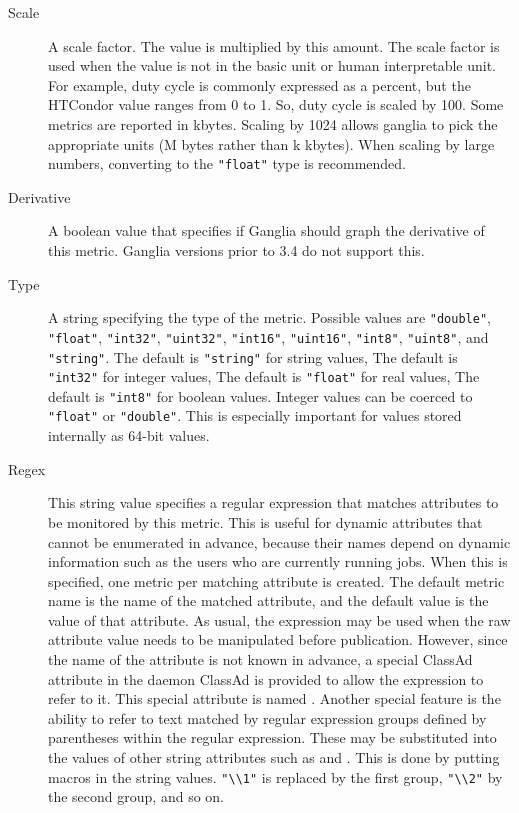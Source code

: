 \begin{description}
  \item[Scale] A scale factor. The value is multiplied by this amount.
    The scale factor is used when the value is not in the basic unit
    or human interpretable unit. For example, duty cycle is commonly
    expressed as a percent, but the HTCondor value ranges from 0 to 1.
    So, duty cycle is scaled by 100. Some metrics are reported in kbytes.
    Scaling by 1024 allows ganglia to pick the appropriate units (M bytes
    rather than k kbytes). When scaling by large numbers, converting to
    the \verb|"float"| type is recommended.

  \item[Derivative] A boolean value that specifies if Ganglia should
    graph the derivative of this metric.  Ganglia versions prior to
    3.4 do not support this.

  \item[Type] A string specifying the type of the metric.  Possible
    values are \verb|"double"|, \verb|"float"|, \verb|"int32"|,
    \verb|"uint32"|, \verb|"int16"|, \verb|"uint16"|,
    \verb|"int8"|, \verb|"uint8"|, and \verb|"string"|.
    The default is \verb|"string"| for string values,
    The default is \verb|"int32"| for integer values,
    The default is \verb|"float"| for real values,
    The default is \verb|"int8"| for boolean values.
    Integer values can be coerced to \verb|"float"| or \verb|"double"|.
    This is especially important for values stored internally as 64-bit
    values.

  \item[Regex] This string value specifies a regular expression that
    matches attributes to be monitored by this metric.  This is useful
    for dynamic attributes that cannot be enumerated in advance,
    because their names depend on dynamic information such as the
    users who are currently running jobs.  When this is specified, one
    metric per matching attribute is created.  The default metric name
    is the name of the matched attribute, and the default value is the
    value of that attribute.  As usual, the  expression
    may be used when the raw attribute value needs to be manipulated
    before publication.  However, since the name of the attribute is
    not known in advance, a special ClassAd attribute in the daemon ClassAd
    is provided to allow the  expression to refer to it.
    This special attribute is named .  Another special
    feature is the ability to refer to text matched by regular
    expression groups defined by parentheses within the regular
    expression.  These may be substituted into the values of other
    string attributes such as  and .  This is
    done by putting macros in the string values.  \verb|"\\1"| is
    replaced by the first group, \verb|"\\2"| by the second group, and
    so on.


\end{description}
